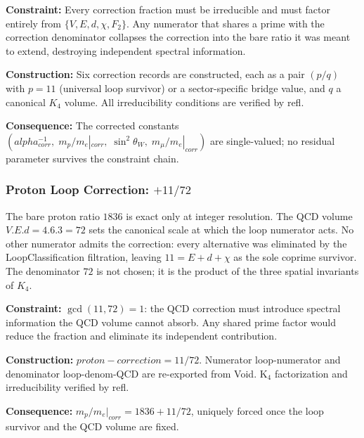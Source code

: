 \documentclass[11pt,a4paper]{book}
\def\alpha{alpha}%
\def\cdot{.}%
\def\mathrm#1{#1}%
\def\texttt#1{#1}%
\begin{document}
\medskip
\noindent
\textbf{Constraint:}
Every correction fraction must be irreducible and must factor entirely from
$\{V, E, d, \chi, F_2\}$.  Any numerator that shares a prime with the correction
denominator collapses the correction into the bare ratio it was meant to extend,
destroying independent spectral information.

\noindent
\textbf{Construction:}
Six correction records are constructed, each as a pair $(p/q)$ with $p = 11$
(universal loop survivor) or a sector-specific bridge value, and $q$ a canonical
$K_4$ volume.  All irreducibility conditions are verified by \texttt{refl}.

\noindent
\textbf{Consequence:}
The corrected constants $(\alpha^{-1}_{\mathrm{corr}},\; m_p/m_e|_{\mathrm{corr}},\;
\sin^2\!\theta_W,\; m_\mu/m_e|_{\mathrm{corr}})$ are single-valued; no residual
parameter survives the constraint chain.

\subsubsection*{Proton Loop Correction: $+11/72$}

The bare proton ratio $1836$ is exact only at integer resolution.  The QCD volume
$V \cdot E \cdot d = 4 \cdot 6 \cdot 3 = 72$ sets the canonical scale at which
the loop numerator acts.  No other numerator admits the correction: every
alternative was eliminated by the \texttt{LoopClassification} filtration, leaving
$11 = E + d + \chi$ as the sole coprime survivor.  The denominator $72$ is not
chosen; it is the product of the three spatial invariants of $K_4$.

\medskip
\noindent
\textbf{Constraint:}
$\gcd(11, 72) = 1$: the QCD correction must introduce spectral information
the QCD volume cannot absorb.  Any shared prime factor would reduce the fraction
and eliminate its independent contribution.

\noindent
\textbf{Construction:}
$\texttt{proton-correction} = 11/72$.  Numerator \texttt{loop-numerator} and
denominator \texttt{loop-denom-QCD} are re-exported from Void.  K$_4$ factorization
and irreducibility verified by \texttt{refl}.

\noindent
\textbf{Consequence:}
$m_p / m_e|_{\mathrm{corr}} = 1836 + 11/72$, uniquely forced once the loop
survivor and the QCD volume are fixed.
\end{document}
